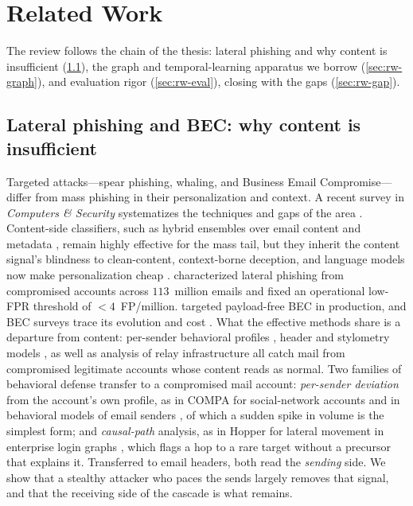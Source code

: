 \section{Related Work}
\label{sec:related}

The review follows the chain of the thesis: lateral phishing and why content is insufficient
(\ref{sec:rw-spear}), the graph and temporal-learning apparatus we borrow (\ref{sec:rw-graph}), and
evaluation rigor (\ref{sec:rw-eval}), closing with the gaps (\ref{sec:rw-gap}).

\subsection{Lateral phishing and BEC: why content is insufficient}
\label{sec:rw-spear}
Targeted attacks---spear phishing, whaling, and Business Email Compromise---differ from mass phishing in their personalization and context.
A recent survey in \emph{Computers \& Security} systematizes the techniques and gaps
of the area \citep{birthriya2025detection}. Content-side classifiers, such as hybrid ensembles over email
content and metadata \citep{bountakas2022helphed}, remain highly effective for the mass tail, but they
inherit the content signal's blindness to clean-content, context-borne deception, and language models now
make personalization cheap \citep{bethany2024evaluating}.
\citet{ho2019detecting} characterized lateral phishing from
compromised accounts across $113$~million emails and fixed an operational low-FPR threshold of $<\!4$~FP/million.
\citet{cidon2019high} targeted payload-free BEC in production, and BEC surveys trace its evolution and cost
\citep{atlam2023business}. What the effective methods share is a departure from content: per-sender behavioral
profiles \citep{gascon2018reading,stringhini2015thataint}, header and stylometry models
\citep{duman2016emailprofiler}, as well as analysis of relay infrastructure \citep{luo2024characterizing} all catch mail
from compromised legitimate accounts whose content reads as normal. Two families of behavioral defense
transfer to a compromised mail account: \emph{per-sender deviation} from the account's own profile, as in COMPA
for social-network accounts \citep{egele2013compa} and in behavioral models of email senders
\citep{stringhini2015thataint}, of which a sudden spike in volume is the simplest form; and \emph{causal-path}
analysis, as in Hopper for lateral movement in enterprise login graphs \citep{ho2021hopper}, which flags a hop to
a rare target without a precursor that explains it. Transferred to email headers, both read the
\emph{sending} side. We show that a stealthy attacker who paces the sends largely removes that signal, and that the receiving side of the
cascade is what remains.

